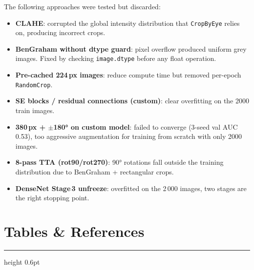 \documentclass[a4paper, 10pt, twocolumn]{article}
\begin{document}
The following approaches were tested but discarded:
\begin{itemize}
  \item \textbf{CLAHE}: corrupted the global intensity distribution that
\texttt{CropByEye} relies on, producing incorrect crops.
  \item \textbf{BenGraham without dtype guard}: pixel overflow produced uniform grey images. Fixed by checking \texttt{image.dtype} before any float operation.
  \item \textbf{Pre-cached 224\,px images}: reduce compute time but removed per-epoch \texttt{RandomCrop}.
  \item \textbf{SE blocks / residual connections (custom)}: clear overfitting on the 2000 train images.
  \item \textbf{380\,px + $\pm$180° on custom model}: failed to converge (3-seed val AUC 0.53), too aggressive augmentation for training from scratch with only 2000 images.
  \item \textbf{8-pass TTA (rot90/rot270)}: 90° rotations fall outside the training distribution due to BenGraham + rectangular crops.
  \item \textbf{DenseNet Stage\,3 unfreeze}: overfitted on the 2\,000 images, two stages are the right stopping point.
\end{itemize}

\newpage
\onecolumn

\section*{\color{accent}Tables \& References}
{\color{rulecolor}\hrule height 0.6pt}
\vspace{6pt}
\end{document}
